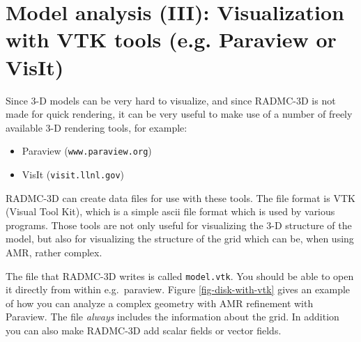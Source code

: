 \documentclass{report}
\begin{document}
\chapter{Model analysis (III): Visualization with VTK tools (e.g. Paraview or VisIt)}
\label{chap-vtk-output}
%
Since 3-D models can be very hard to visualize, and since RADMC-3D is not
made for quick rendering, it can be very useful to make use of a number of
freely available 3-D rendering tools, for example:
\begin{itemize}
\item Paraview ({\small\tt www.paraview.org})
\item VisIt ({\small\tt visit.llnl.gov})
\end{itemize}
RADMC-3D can create data files for use with these tools. The file format is
VTK (Visual Tool Kit), which is a simple ascii file format which is used by
various programs. Those tools are not only useful for visualizing the
3-D structure of the model, but also for visualizing the structure of the
grid which can be, when using AMR, rather complex. 

The file that RADMC-3D writes is called {\small\tt model.vtk}. You should be
able to open it directly from within e.g.\ paraview. Figure
\ref{fig-disk-with-vtk} gives an example of how you can analyze a complex
geometry with AMR refinement with Paraview. The file {\em always} includes
the information about the grid. In addition you can also make RADMC-3D add
scalar fields or vector fields.
\end{document}
